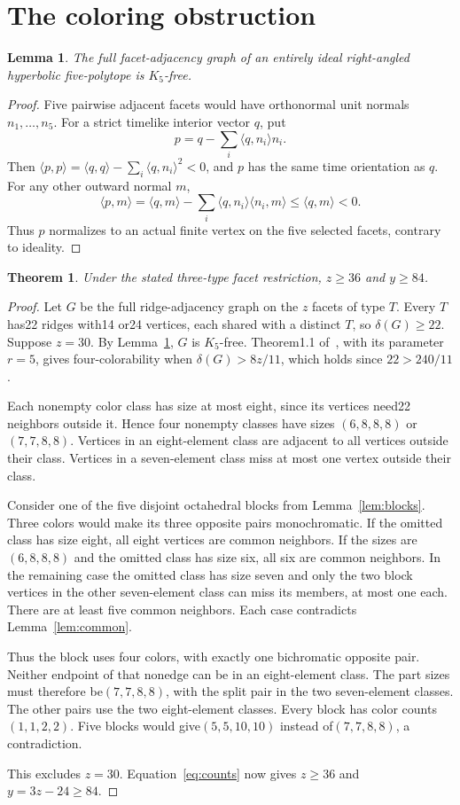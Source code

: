 \documentclass[11pt]{article}
\newtheorem{theorem}{Theorem}
\newtheorem{lemma}{Lemma}
\begin{document}
\section{The coloring obstruction}
\begin{lemma}\label{lem:clique}
The full facet-adjacency graph of an entirely ideal right-angled
hyperbolic five-polytope is $K_5$-free.
\end{lemma}
\begin{proof}
Five pairwise adjacent facets would have orthonormal unit normals
$n_1,\ldots,n_5$. For a strict timelike interior vector $q$, put
\[
 p=q-\sum_i\langle q,n_i\rangle n_i.
\]
Then $\langle p,p\rangle=\langle q,q\rangle-
\sum_i\langle q,n_i\rangle^2<0$, and $p$ has the same time orientation
as $q$. For any other outward normal $m$,
\[
 \langle p,m\rangle=\langle q,m\rangle-
 \sum_i\langle q,n_i\rangle\langle n_i,m\rangle
 \le\langle q,m\rangle<0.
\]
Thus $p$ normalizes to an actual finite vertex on the five selected
facets, contrary to ideality.
\end{proof}

\begin{theorem}
Under the stated three-type facet restriction, $z\ge36$ and $y\ge84$.
\end{theorem}
\begin{proof}
Let $G$ be the full ridge-adjacency graph on the $z$ facets of type $T$.
Every $T$ has22 ridges with14 or24 vertices, each shared with a distinct
$T$, so $\delta(G)\ge22$. Suppose $z=30$.
By Lemma~\ref{lem:clique}, $G$ is $K_5$-free. Theorem1.1 of~\cite{AES},
with its parameter $r=5$, gives four-colorability when
$\delta(G)>8z/11$, which holds since $22>240/11$.

Each nonempty color class has size at most eight, since its vertices
need22 neighbors outside it. Hence four nonempty classes have sizes
$(6,8,8,8)$ or$(7,7,8,8)$. Vertices in an eight-element class are
adjacent to all vertices outside their class. Vertices in a seven-element
class miss at most one vertex outside their class.

Consider one of the five disjoint octahedral blocks from
Lemma~\ref{lem:blocks}. Three colors would make its three opposite
pairs monochromatic. If the omitted class has size eight, all eight
vertices are common neighbors. If the sizes are$(6,8,8,8)$ and the
omitted class has size six, all six are common neighbors. In the
remaining case the omitted class has size seven and only the two
block vertices in the other seven-element class can miss its members,
at most one each. There are at least five common neighbors. Each
case contradicts Lemma~\ref{lem:common}.

Thus the block uses four colors, with exactly one bichromatic opposite
pair. Neither endpoint of that nonedge can be in an eight-element
class. The part sizes must therefore be$(7,7,8,8)$, with the split
pair in the two seven-element classes. The other pairs use the two
eight-element classes. Every block has color counts$(1,1,2,2)$.
Five blocks would give$(5,5,10,10)$ instead of$(7,7,8,8)$, a contradiction.

This excludes $z=30$. Equation~\eqref{eq:counts} now gives $z\ge36$
and $y=3z-24\ge84$.
\end{proof}
\end{document}
